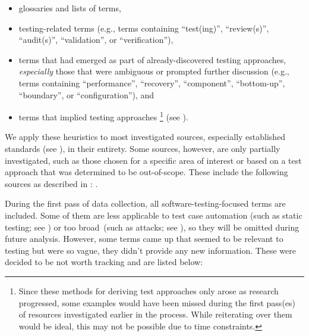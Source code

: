 \begin{itemize}
    \item glossaries and lists of terms,
    \item testing-related terms (e.g., terms containing ``test(ing)'',
          \ifnotpaper ``review(s)'', ``audit(s)'', \fi
          ``validation'', or ``verification''),
    \item terms that had emerged as part of already-discovered
          testing approaches, \emph{especially} those that were ambiguous
          or prompted further discussion (e.g., terms containing
          ``performance'', ``recovery'', ``component'', ``bottom-up'',
          \ifnotpaper ``boundary'', \fi or ``configuration''), and
    \item terms that implied testing approaches%
          \ifnotpaper\footnote{
                  Since these methods for deriving test approaches only arose
                  as research progressed, some examples would have been missed
                  during the first pass(es) of resources investigated earlier
                  in the process. While reiterating over them would be ideal,
                  this may not be possible due to time constraints.
              } (see )\fi.
\end{itemize}
We apply these heuristics to most investigated sources, especially established
standards (see ), in their entirety. Some sources, however, are only
partially investigated, such as those chosen for a specific area of
interest or based on a test approach that was determined to be out-of-scope.
These include the following sources as described in :
\citep{ISO2022,ISO2015,Dominguez-PumarEtAl2020,PierreEtAl2017,
    TrudnowskiEtAl2017,YuEtAl2011,Tsui2007,Goralski1999}.

During the first pass of data collection, all software-testing-focused terms
are included. Some of them are less applicable to test case automation
\ifnotpaper (such as static testing; see )
\fi or too broad\ifnotpaper\ (such as attacks; see %
    )\fi, so they will be omitted during future analysis.
\ifnotpaper
    However, some terms came up that seemed to be relevant to
    testing but were so vague, they didn't provide any new information. These were
    decided to be not worth tracking and are listed below:

